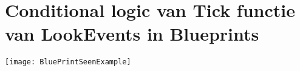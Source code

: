 \chapter{Conditional logic van Tick functie van LookEvents in Blueprints}
\label{appendix:LookEventsLogicBlueprints}
\texttt{[image: BluePrintSeenExample]}
